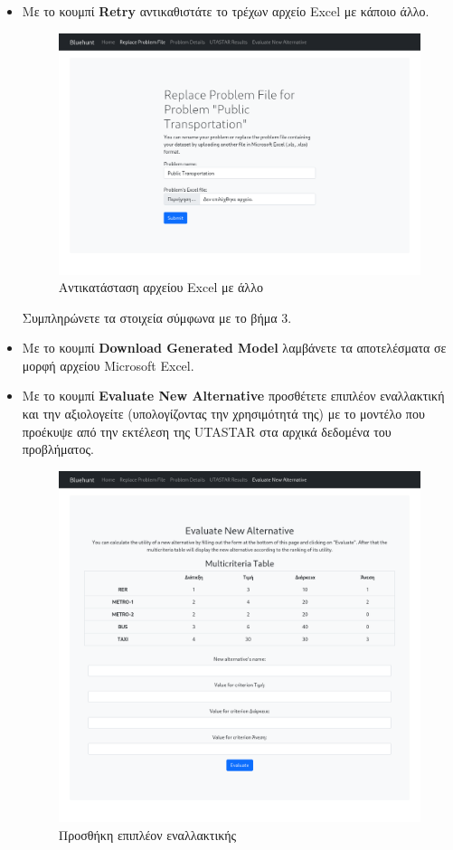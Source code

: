\documentclass[11pt,a4paper,titlepage]{article}
\numberwithin{equation}{section}
\begin{document}
\begin{enumerate}
	\begin{itemize}
		\item Με το κουμπί \textbf{Retry} αντικαθιστάτε το τρέχων αρχείο Excel με κάποιο άλλο.
		
		\begin{figure}[H]
			\centering
			\includegraphics[width=0.8\linewidth]{media/retry.png}
			\caption{Αντικατάσταση αρχείου Excel με άλλο}
			\label{fig:retry}
		\end{figure}
	
		Συμπληρώνετε τα στοιχεία σύμφωνα με το βήμα 3.
				
		\item Με το κουμπί \textbf{Download Generated Model} λαμβάνετε τα αποτελέσματα σε μορφή αρχείου Microsoft Excel. 
		\item Με το κουμπί \textbf{Evaluate New Alternative} προσθέτετε επιπλέον εναλλακτική και την αξιολογείτε (υπολογίζοντας την χρησιμότητά της) με το μοντέλο που προέκυψε από την εκτέλεση της UTASTAR στα αρχικά δεδομένα του προβλήματος.
		
		\begin{figure}[H]
			\centering
			\includegraphics[width=0.8\linewidth]{media/evaluate.png}
			\caption{Προσθήκη επιπλέον εναλλακτικής}
			\label{fig:evaluate}
		\end{figure}
		

\end{itemize}
\end{enumerate}
\end{document}

